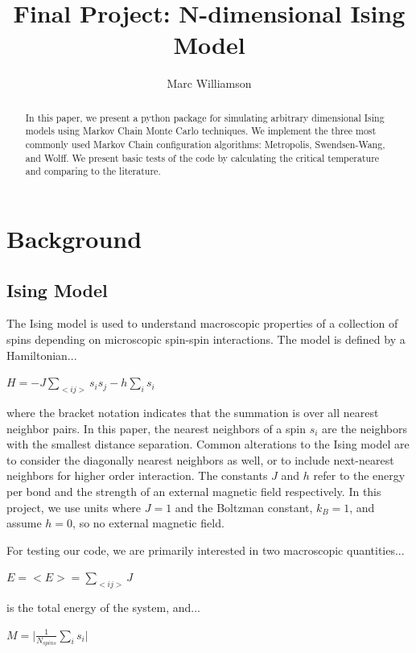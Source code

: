 \documentclass[a4paper]{article}
\title{Final Project: N-dimensional Ising Model}
\author{Marc Williamson}
\begin{document}
\maketitle

\begin{abstract}
In this paper, we present a python package for simulating arbitrary dimensional Ising models using Markov Chain Monte Carlo techniques. We implement the three most commonly used Markov Chain configuration algorithms: Metropolis, Swendsen-Wang, and Wolff. We present basic tests of the code by calculating the critical temperature and comparing to the literature.
\end{abstract}

\section{Background}
\subsection{Ising Model}
The Ising model is used to understand macroscopic properties of a collection of spins depending on microscopic spin-spin interactions. The model is defined by a Hamiltonian...
\begin{center}
	$H=-J\sum_{<ij>}s_{i}s_{j}-h\sum_{i}s_{i}$
\end{center}
where the bracket notation indicates that the summation is over all nearest neighbor pairs. In this paper, the nearest neighbors of a spin $s_{i}$ are the neighbors with the smallest distance separation.  Common alterations to the Ising model are to consider the diagonally nearest neighbors as well, or to include next-nearest neighbors for higher order interaction. The constants $J$ and $h$ refer to the energy per bond and the strength of an external magnetic field respectively. In this project, we use units where $J=1$ and the Boltzman constant, $k_{B}=1$, and assume $h=0$, so no external magnetic field. 

For testing our code, we are primarily interested in two macroscopic quantities...
\begin{center}
	$E=<E>=\sum_{<ij>}J$
\end{center}
is the total energy of the system, and...
\begin{center}
	$M=\big|\frac{1}{N_{spins}}\sum_{i}s_{i}\big|$
\end{center}
\end{document}
